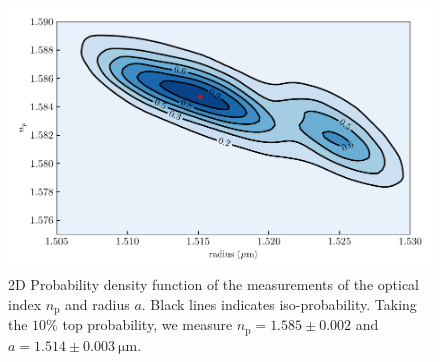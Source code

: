 \begin{figure}[h!]
	\centering
	\includegraphics{02_body/chapter2/images/KDErn.pdf}
	\caption{2D Probability density function of the measurements of the optical index $n_\mathrm{p}$ and radius $a$. Black lines indicates iso-probability. Taking the $10\% $ top probability, we measure $n_\mathrm{p} = 1.585 \pm 0.002$ and $a=1.514 \pm 0.003 ~ \mathrm{\mu m}$. }
	\label{fig:KDErn}
\end{figure}